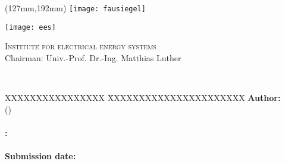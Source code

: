 \begin{titlepage}
	\thispagestyle{empty}

	\begin{textblock*}{\textwidth}(127mm,192mm)
	\texttt{[image: fausiegel]}
	\end{textblock*}

	\begin{minipage}[]{47mm}
		\texttt{[image: ees]}
	\end{minipage}
	\begin{minipage}[]{.7\textwidth}
		\raggedleft
		\textsc{Institute for electrical energy systems}\\ %
		Chairman: Univ.-Prof. Dr.-Ing. Matthias Luther
	\end{minipage}
	
	\vspace{51mm}
	
	{\centering
	
	\large{\arbeit} \\	
	\Large{\textbf{\titel}}
	
	\par}
	
	\vspace{105mm}
	
	{\raggedright
	\begin{tabbing}
		XXXXXXXXXXXXXXXX \= XXXXXXXXXXXXXXXXXXXXXX \kill
		\textbf{Author:} 	\> \autor \\
							\> (\matrikelnr)		\\
													\>									\\
		\textbf{\langdbbetreuer:}		\> \betreuer \\
													\>									\\
		\textbf{Submission date:}	\> \datumAbgabe															
	\end{tabbing}
	\par}
\end{titlepage}
